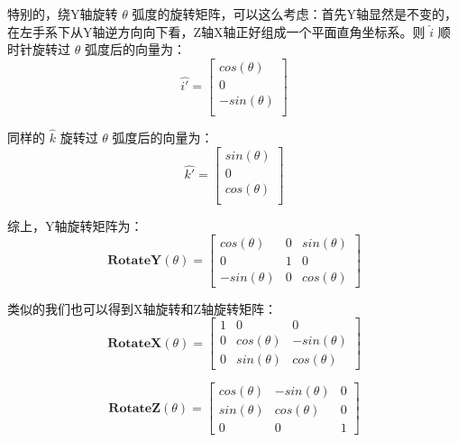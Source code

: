 \documentclass[12pt,oneside,a4paper]{ctexart}
\begin{document}
特别的，绕Y轴旋转 $\theta$ 弧度的旋转矩阵，可以这么考虑：首先Y轴显然是不变的，在左手系下从Y轴逆方向向下看，Z轴X轴正好组成一个平面直角坐标系。则 $\hat{i}$ 顺时针旋转过 $\theta$ 弧度后的向量为：
\begin{equation*}
	\hat{i'}=\begin{bmatrix}
		cos(\theta)  \\
		0            \\
		-sin(\theta) \\
	\end{bmatrix}
\end{equation*}

同样的 $\hat{k}$ 旋转过 $\theta$ 弧度后的向量为：
\begin{equation*}
	\hat{k'}=\begin{bmatrix}
		sin(\theta) \\
		0           \\
		cos(\theta) \\
	\end{bmatrix}
\end{equation*}

综上，Y轴旋转矩阵为：
\begin{equation}
	\mathbf{RotateY}(\theta)=\begin{bmatrix}
		cos(\theta)  & 0 & sin(\theta) \\
		0            & 1 & 0           \\
		-sin(\theta) & 0 & cos(\theta)
	\end{bmatrix}
	\label{RotateY}
\end{equation}

类似的我们也可以得到X轴旋转和Z轴旋转矩阵：
\begin{equation}
	\mathbf{RotateX}(\theta)=\begin{bmatrix}
		1 & 0           & 0            \\
		0 & cos(\theta) & -sin(\theta) \\
		0 & sin(\theta) & cos(\theta)
	\end{bmatrix}
	\label{RotateX}
\end{equation}

\begin{equation}
	\mathbf{RotateZ}(\theta)=\begin{bmatrix}
		cos(\theta) & -sin(\theta) & 0 \\
		sin(\theta) & cos(\theta)  & 0 \\
		0           & 0            & 1
	\end{bmatrix}
	\label{RotateZ}
\end{equation}
\end{document}
